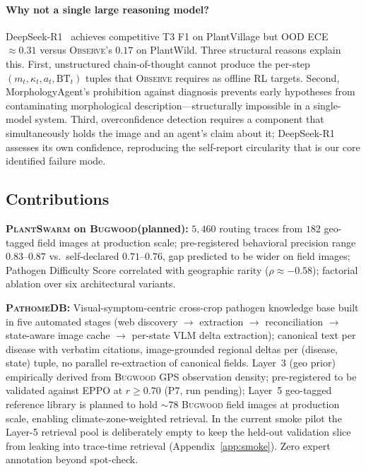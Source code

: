 \documentclass[11pt,twocolumn]{article}
\newcommand{\observe}{\textsc{Observe}\xspace}
\newcommand{\plantswarm}{\textsc{PlantSwarm}\xspace}
\newcommand{\pathomedb}{\textsc{PathomeDB}\xspace}
\newcommand{\bugwood}{\textsc{Bugwood}\xspace}
\begin{document}
\paragraph{Why not a single large reasoning model?}
DeepSeek-R1~\citep{guo2025deepseek} achieves
competitive T3 F1 on PlantVillage but OOD
ECE ${\approx}0.31$ versus \observe's $0.17$
on PlantWild. Three structural reasons explain
this. First, unstructured chain-of-thought
cannot produce the per-step $(m_t, \kappa_t,
a_t, \text{BT}_t)$ tuples that \observe requires
as offline RL targets. Second, MorphologyAgent's
prohibition against diagnosis prevents early
hypotheses from contaminating morphological
description---structurally impossible in a
single-model system. Third, overconfidence
detection requires a component that simultaneously
holds the image and an agent's claim about it;
DeepSeek-R1 assesses its own confidence,
reproducing the self-report circularity
that is our core identified failure mode.

\subsection{Contributions}

\noindent\textbf{\plantswarm on \bugwood (planned):}
$5{,}460$ routing traces from $182$ geo-tagged
field images at production scale; pre-registered
behavioral precision range $0.83$--$0.87$
vs.\ self-declared $0.71$--$0.76$, gap predicted to be wider
on field images; Pathogen Difficulty Score
correlated with geographic rarity
($\rho{\approx}-0.58$); factorial ablation
over six architectural variants.

\noindent\textbf{\pathomedb:}
Visual-symptom-centric cross-crop pathogen
knowledge base built in five automated stages
(web discovery $\to$ extraction $\to$ reconciliation
$\to$ state-aware image cache $\to$ per-state VLM
delta extraction); canonical text per disease with
verbatim citations, image-grounded regional deltas
per (disease, state) tuple, no parallel re-extraction
of canonical fields. Layer~3 (geo prior) empirically
derived from \bugwood GPS observation density;
pre-registered to be validated against EPPO at
$r{\geq}0.70$ (P7, run pending);
Layer~5 geo-tagged reference library is planned to
hold ${\sim}78$ \bugwood field images at production
scale, enabling climate-zone-weighted retrieval. In
the current smoke pilot the Layer-5 retrieval pool
is deliberately empty to keep the held-out
validation slice from leaking into trace-time
retrieval (Appendix~\ref{app:smoke}). Zero expert
annotation beyond spot-check.
\end{document}

